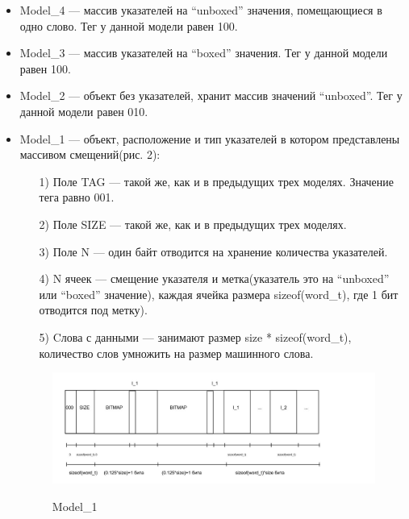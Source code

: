 \documentclass[12pt,a4paper]{article}
\begin{document}
\begin{itemize}
\item Model\_4 — массив указателей на ``unboxed'' значения, помещающиеся в одно слово.
Тег у данной модели равен 100.
\item Model\_3 — массив указателей на ``boxed'' значения.
Тег у данной модели равен 100.

\item Model\_2 — объект без указателей, хранит массив значений ``unboxed''.
Тег у данной модели равен 010.

\item Model\_1 — объект, расположение и тип указателей в котором представлены массивом смещений(рис. 2):
\begin{enumerate}
\item[1)] Поле TAG — такой же, как и в предыдущих трех моделях. Значение тега равно 001.
\item[2)] Поле SIZE — такой же, как и в предыдущих трех моделях.
\item[3)] Поле N — один байт отводится на хранение количества указателей.
\item[4)] N ячеек — смещение указателя и метка(указатель это на ``unboxed'' или ``boxed''  значение), каждая ячейка размера sizeof(word\_t), где 1 бит отводится под метку). 
\item[5)] Cлова с данными — занимают размер  size * sizeof(word\_t), количество слов умножить на размер машинного слова.
\end{enumerate}

\begin{figure}[h]
\includegraphics[width=1\textwidth]{2}\\
\caption{Model\_1}
\end{figure}


\end{itemize}
\end{document}
